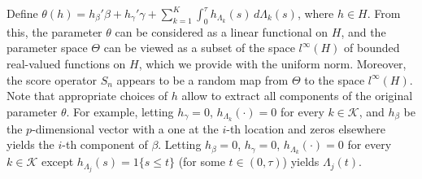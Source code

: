 \documentclass{statsoc}
\begin{document}
Define $\theta(h)=h_\beta'\beta+h_\gamma'\gamma+\sum_{k=1}^K\int_0^\tau h_{\Lambda_k}(s)\,d\Lambda_k(s)$, where $h\in H$. From this, the parameter $\theta$ can be considered as a linear functional on $H$, and the parameter space $\Theta$ can be viewed as a subset of the space $l^\infty(H)$ of bounded real-valued functions on $H$, which we provide with the uniform norm. Moreover, the score operator $S_n$ appears to be a random map from $\Theta$ to the space $l^\infty(H)$. Note that appropriate choices of $h$ allow to extract all components of the original parameter $\theta$. For example, letting $h_\gamma=0$, $h_{\Lambda_k}(\cdot)=0$ for every $k\in\mathcal K$, and $h_\beta$ be the $p$-dimensional vector with a one at the $i$-th location and zeros elsewhere yields the $i$-th component of $\beta$. Letting $h_\beta=0$, $h_\gamma=0$, $h_{\Lambda_k}(\cdot)=0$ for every $k\in\mathcal K$ except $h_{\Lambda_j}(s)=1\{s\leq t\}$ (for some $t\in (0,\tau)$) yields $\Lambda_j(t)$.
\end{document}
